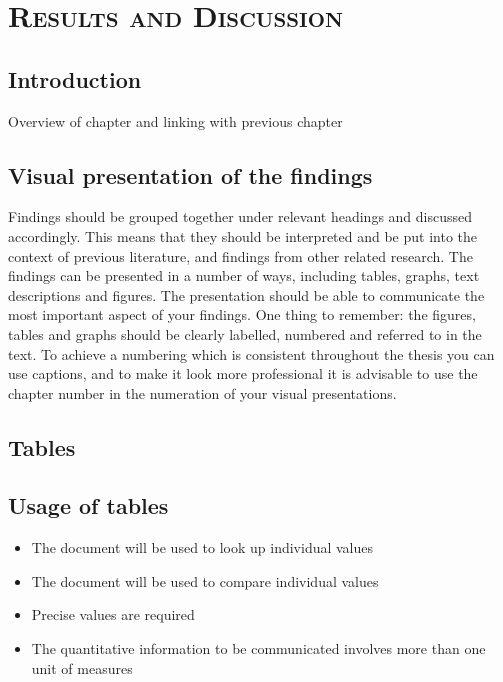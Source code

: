 %
%
% 
% 
% 


\chapter{\textsc{Results and Discussion}}
\label{chap:results}

\section{Introduction}
\label{sec:introchapter4}

Overview of chapter and linking with previous chapter

\section{Visual presentation of the findings}
\label{sec:visualrep}

Findings should be grouped together under relevant headings and discussed accordingly. This means that they should be interpreted and be 
put into the context of previous literature, and findings from other related research. The findings can be presented in a number of ways, 
including tables, graphs, text descriptions and figures. The presentation should be able to communicate the most important aspect of your findings. 
One thing to remember: the figures, tables and graphs should be clearly labelled, numbered and referred to in the text. To achieve a numbering which 
is consistent throughout the thesis you can use captions, and to make it look more professional it is advisable to use the chapter number in the numeration of your visual presentations. 

\section{Tables}
\label{sec:tables}

\section{Usage of tables}
\label{sec:usagetables}

\begin{itemize}
\item The document will be used to look up individual values
\item The document will be used to compare individual values
\item Precise values are required
\item The quantitative information to be communicated involves more than one unit of measures 
\end{itemize}

